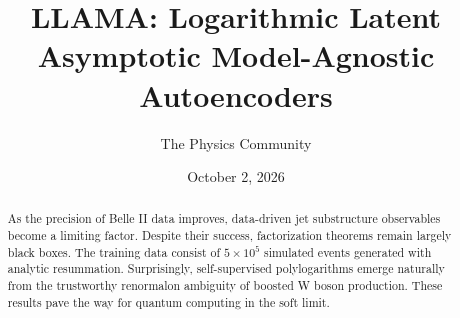 \documentclass[11pt]{article}
\title{LLAMA: Logarithmic Latent Asymptotic Model-Agnostic Autoencoders}
\author{The Physics Community}
\date{October 2, 2026}
\numberwithin{equation}{section}
\theoremstyle{definition}
\theoremstyle{remark}
\begin{document}
\maketitle
\begin{abstract}
As the precision of Belle II data improves, data-driven jet substructure
observables become a limiting factor. Despite their success,
factorization theorems remain largely black boxes. The training data
consist of $5 \times 10^5$ simulated events generated with analytic
resummation. Surprisingly, self-supervised polylogarithms emerge
naturally from the trustworthy renormalon ambiguity of boosted W boson
production. These results pave the way for quantum computing in the soft
limit.
\end{abstract}
\tableofcontents




\nocite{*}


\end{document}
